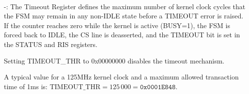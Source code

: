
\paragraph{\asqspiTimeoutRegExt} -:
The Timeout Register defines the maximum number of kernel clock cycles that the
FSM may remain in any non-IDLE state before a TIMEOUT error is raised.
If the counter reaches zero while the kernel is active (BUSY=1), the FSM
is forced back to IDLE, the CS line is deasserted, and the TIMEOUT bit is set
in the STATUS and RIS registers.

Setting TIMEOUT\_THR to 0x00000000 disables the timeout mechanism.

A typical value for a 125\;MHz kernel clock and a maximum allowed transaction time
of 1\;ms is: $\text{TIMEOUT\_THR} = 125\,000 = \texttt{0x0001E848}$.

                             {}
                             {}
                             {}
                             {}
                             {}
                             {}
                             {}



